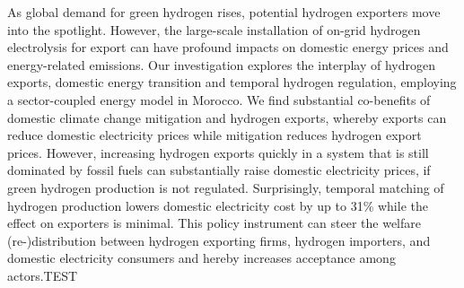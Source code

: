 
As global demand for green hydrogen rises, potential hydrogen exporters move into the spotlight.
However, the large-scale installation of on-grid hydrogen electrolysis for export can have profound impacts on domestic energy prices and energy-related emissions.
Our investigation explores the interplay of hydrogen exports, domestic energy transition and temporal hydrogen regulation, employing a sector-coupled energy model in Morocco. 
We find substantial co-benefits of domestic climate change mitigation and hydrogen exports, whereby exports can reduce domestic electricity prices while mitigation reduces hydrogen export prices.
However, increasing hydrogen exports quickly in a system that is still dominated by fossil fuels can substantially raise domestic electricity prices, if green hydrogen production is not regulated.
Surprisingly, temporal matching of hydrogen production lowers domestic electricity cost by up to 31\% while the effect on exporters is minimal. 
This policy instrument can steer the welfare (re-)distribution between hydrogen exporting firms, hydrogen importers, and domestic electricity consumers and hereby increases acceptance among actors.TEST